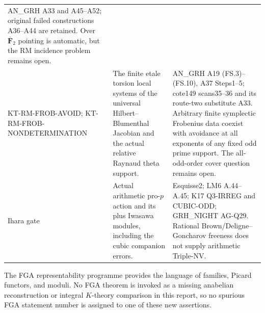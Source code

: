 \begin{longtable}{>{\raggedright\arraybackslash}p{}
>{\raggedright\arraybackslash}p{}
>{\raggedright\arraybackslash}p{}}
AN\_GRH A33 and A45--A52; original failed constructions
A36--A44 are retained. Over $\overline{\mathbf F}_2$ pointing
is automatic, but the RM incidence problem remains open.\\
KT-RM-FROB-AVOID; KT-RM-FROB-NONDETERMINATION &
The finite etale torsion local systems of the universal
Hilbert--Blumenthal Jacobian and the actual relative
Raynaud theta support. &
AN\_GRH A19 (FS.3)--(FS.10), A37 Steps1--5;
cote149 scans35--36 and its route-two substitute A33.
Arbitrary finite symplectic Frobenius data coexist with
avoidance at all exponents of any fixed odd prime support.
The all-odd-order cover question remains open.\\
Ihara gate &
Actual arithmetic pro-$p$ action and its plus Iwasawa modules,
including the cubic companion errors. &
Esquisse2; LM6 A.44--A.45; K17 Q3-IRREG and CUBIC-ODD;
GRH\_NIGHT AG-Q29. Rational Brown/Deligne--Goncharov
freeness does not supply arithmetic Triple-NV.\\
\bottomrule
\end{longtable}
\normalsize

The FGA representability programme provides the language of
families, Picard functors, and moduli. No FGA theorem is
invoked as a missing anabelian reconstruction or integral
$K$-theory comparison in this report, so no spurious FGA
statement number is assigned to one of these new assertions.
